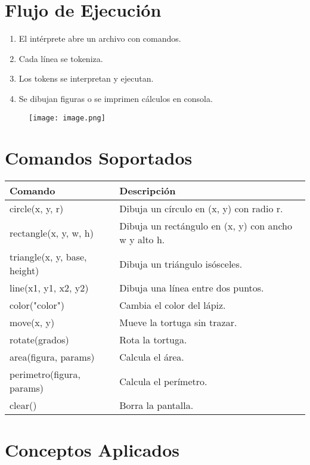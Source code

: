 \documentclass[12pt]{article}
\begin{document}
\section{Flujo de Ejecución}

\begin{enumerate}
    \item El intérprete abre un archivo con comandos.
    \item Cada línea se tokeniza.
    \item Los tokens se interpretan y ejecutan.
    \item Se dibujan figuras o se imprimen cálculos en consola.
\end{enumerate}

\begin{figure}[H]
    \centering
        \texttt{[image: image.png]}
        \label{fig:enter-label}
    \end{figure}

\section{Comandos Soportados}

\begin{tabular}{|l|l|}
\hline
\textbf{Comando} & \textbf{Descripción} \\
\hline
circle(x, y, r) & Dibuja un círculo en (x, y) con radio r. \\
rectangle(x, y, w, h) & Dibuja un rectángulo en (x, y) con ancho w y alto h. \\
triangle(x, y, base, height) & Dibuja un triángulo isósceles. \\
line(x1, y1, x2, y2) & Dibuja una línea entre dos puntos. \\
color("color") & Cambia el color del lápiz. \\
move(x, y) & Mueve la tortuga sin trazar. \\
rotate(grados) & Rota la tortuga. \\
area(figura, params) & Calcula el área. \\
perimetro(figura, params) & Calcula el perímetro. \\
clear() & Borra la pantalla. \\
\hline
\end{tabular}

\section{Conceptos Aplicados}
\end{document}
